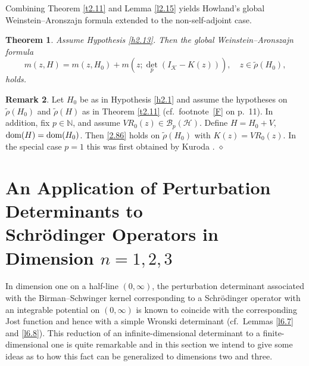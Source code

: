 \documentclass[reqno,10pt, centertags]{amsart}
\newcommand{\bbN}{{\mathbb{N}}}
\newcommand{\cB}{{\mathcal B}}
\newcommand{\cH}{{\mathcal H}}
\newcommand{\cK}{{\mathcal K}}
\newcommand{\lb}{\label}
\newcommand{\wti}{\widetilde}
\newcommand{\dom}{\text{\rm{dom}}}
\numberwithin{equation}{section}
\newtheorem{theorem}{Theorem}[section]
\theoremstyle{definition}
\newtheorem{remark}[theorem]{Remark}
\begin{document}
Combining Theorem \ref{t2.11} and Lemma \ref{l2.15} yields
Howland's global Weinstein--Aronszajn formula \cite{Ho70} extended
to the non-self-adjoint case.

\begin{theorem} \lb{t2.16}
Assume Hypothesis \ref{h2.13}. Then the global
Weinstein--Aronszajn formula
\begin{equation}
m(z,H)=m(z,H_0)+m(z;{\det}_p(I_{\cK}-K(z))), \quad z\in\wti \rho (H_0),
\lb{2.86}
\end{equation}
holds.
\end{theorem}

\begin{remark} \lb{r2.17}
Let $H_0$ be as in Hypothesis \ref{h2.1} and assume the hypotheses on 
$\widetilde \rho(H_0)$ and $\widetilde \rho(H)$ as in Theorem \ref{t2.11} 
(cf.\ footnote~\ref{F} on p.~11). In addition, fix $p\in\bbN$, and assume
$VR_0(z)\in\cB_p(\cH)$. Define $H=H_0+V$, $\dom(H)=\dom(H_0)$. Then
\eqref{2.86} holds on $\wti \rho (H_0)$ with $K(z)=VR_0(z)$. In the
special case $p=1$ this was first obtained by Kuroda \cite{Ku61}. 
\hfill $\diamond$ 
\end{remark}


\section{An Application of Perturbation Determinants to \\ Schr\"odinger
Operators in Dimension $n=1,2,3$}  \lb{s6}

In dimension one on a half-line $(0,\infty)$, the perturbation determinant
associated with the Birman--Schwinger kernel corresponding to a
Schr\"odinger operator with an integrable potential on $(0,\infty)$ is
known to coincide with the corresponding Jost function and hence with a
simple Wronski determinant (cf.\ Lemmas \ref{l6.7} and \ref{l6.8}). This
reduction of an infinite-dimensional determinant to a finite-dimensional
one is quite remarkable and in this section we intend to give some ideas
as to how this fact can be generalized to dimensions two and three.
\end{document}
